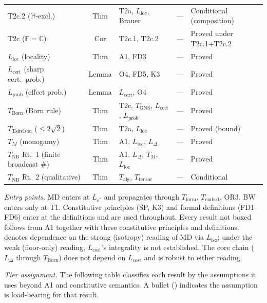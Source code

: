 \documentclass[11pt,a4paper]{article}
\theoremstyle{definition}
\newcommand{\eps}{\varepsilon}
\begin{document}
\begin{center}
\begin{tabular}{@{}lclcl@{}}
T2c.2 ($\mathbb{H}$-excl.) & Thm & T2a, $L_{\mathrm{loc}}$, Brauer & --- & Conditional (composition) \\
T2c ($\mathbb{F} = \mathbb{C}$) & Cor & T2c.1, T2c.2 & --- & Proved under T2c.1+T2c.2 \\
$L_{\mathrm{loc}}$ (locality) & Thm & A1, FD3 & --- & Proved \\
$L_{\mathrm{cert}}$ (sharp cert.\ prob.) & Lemma & O4, FD5, K3 & --- & Proved \\
$L_{\mathrm{prob}}$ (effect prob.) & Lemma & $L_{\mathrm{cert}}$, O4 & --- & Proved \\
$T_{\mathrm{Born}}$ (Born rule) & Thm & T2c, $T_{\mathrm{GNS}}$, $L_{\mathrm{cert}}$, $L_{\mathrm{prob}}$ & --- & Proved \\
$T_{\mathrm{Tsirelson}}$ ($\le 2\sqrt{2}$) & Thm & T2a, $L_{\mathrm{loc}}$ & --- & Proved (bound) \\
$T_M$ (monogamy) & Thm & A1, $L_{\mathrm{loc}}$, $L_\Delta$ & --- & Proved \\
$T_{\mathrm{NB}}$ Rt.~1 (finite broadcast \#) & Thm & A1, $L_\Delta$, $T_M$, $L_{\mathrm{loc}}$ & --- & Proved \\
$T_{\mathrm{NB}}$ Rt.~2 (qualitative) & Thm & $T_{\mathrm{alg}}$, $T_{\mathrm{tensor}}$ & --- & Conditional \\
\bottomrule
\end{tabular}
\end{center}

\noindent\textit{Entry points.}  MD enters at $L_{\eps^*}$ and propagates through $T_{\mathrm{form}}$, $T_{\mathrm{embed}}$, OR3.  BW enters only at T1.  Constitutive principles (SP, K3) and formal definitions (FD1--FD6) enter at the definitions and are used throughout.  Every result not boxed follows from A1 together with these constitutive principles and definitions.   denotes dependence on the strong (isotropy) reading of MD via $L_{\mathrm{iso}}$; under the weak (floor-only) reading, $L_{\mathrm{cost}}$'s integrality is not established.  The core chain ($L_\Delta$ through $T_{\mathrm{Born}}$) does not depend on $L_{\mathrm{cost}}$ and is robust to either reading.

\medskip\noindent\textit{Tier assignment.}  The following table classifies each result by the assumptions it uses beyond A1 and constitutive semantics.  A bullet (\textbullet) indicates the assumption is load-bearing for that result.
\end{document}
